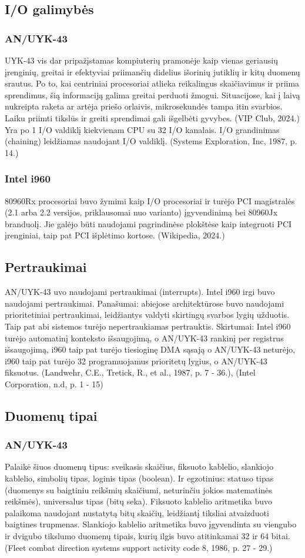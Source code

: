 \documentclass{article}
\begin{document}
\subsection{I/O galimybės}
\subsubsection{AN/UYK-43}
UYK-43 vis dar pripažįstamas kompiuterių pramonėje kaip vienas geriausių įrenginių, greitai ir efektyviai priimančių didelius išorinių jutiklių ir kitų duomenų srautus. Po to, kai centriniai procesoriai atlieka reikalingus skaičiavimus ir priima sprendimus, šią informaciją galima greitai perduoti žmogui. Situacijose, kai į laivą nukreipta raketa ar artėja priešo orlaivis, mikrosekundės tampa itin svarbios. Laiku priimti tikslūs ir greiti sprendimai gali išgelbėti gyvybes. (VIP Club, 2024.) Yra  po 1 I/O valdiklį kiekvienam CPU su 32 I/O kanalais. I/O grandinimas (chaining) leidžiamas naudojant I/O valdiklį. (Systems Exploration, Inc, 1987, p. 14.)
\subsubsection{Intel i960}
80960Rx procesoriai buvo žymimi kaip I/O procesoriai ir turėjo PCI magistralės (2.1 arba 2.2 versijos, priklausomai nuo varianto) įgyvendinimą bei 80960Jx branduolį. Jie galėjo būti naudojami pagrindinėse plokštėse kaip integruoti PCI įrenginiai, taip pat PCI išplėtimo kortose. (Wikipedia, 2024.)
\subsection{Pertraukimai}
AN/UYK-43 uvo naudojami pertraukimai (interrupts). Intel i960 irgi buvo naudojami pertraukimai. Panašumai: abiejose architektūrose buvo naudojami prioritetiniai pertraukimai, leidžiantys valdyti skirtingų svarbos lygių užduotis. Taip pat abi sistemos turėjo nepertraukiamas pertrauktis. Skirtumai: Intel i960 turėjo automatinį konteksto išsaugojimą, o AN/UYK-43 rankinį per registrus išsaugojimą, i960 taip pat turėjo tiesioginę DMA sąsają o AN/UYK-43 neturėjo, i960 taip pat turėjo 32 programuojamus prioritetų lygius, o AN/UYK-43 fiksuotus. (Landwehr, C.E., Tretick, R., et al., 1987, p. 7 - 36.), (Intel Corporation, n.d, p. 1 - 15)
\subsection{Duomenų tipai}
\subsubsection{AN/UYK-43}
Palaikė šiuos duomenų tipus: sveikasis skaičius, fiksuoto kablelio, slankiojo kablelio, simbolių tipas, loginis tipas (boolean). Ir egzotinius: statuso tipas (duomenys su baigtiniu reikšmių skaičiumi, neturinčiu jokios matematinės reikšmės), universalus tipas (bitų seka). Fiksuoto kablelio aritmetika buvo palaikoma naudojant nustatytą bitų skaičių, leidžiantį tiksliai atvaizduoti baigtines trupmenas. Slankiojo kablelio aritmetika buvo įgyvendinta su viengubo ir dvigubo tikslumo duomenų tipais, kurių ilgis buvo atitinkamai 32 ir 64 bitai. (Fleet combat direction systems support activity code 8, 1986, p. 27 - 29.)
\end{document}
